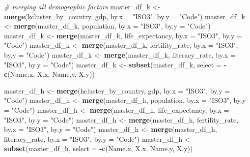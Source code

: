 \documentclass[]{article}
\newenvironment{Shaded}{\begin{snugshade}}{\end{snugshade}}
\newcommand{\CommentTok}[1]{\textcolor[rgb]{0.56,0.35,0.01}{\textit{#1}}}
\newcommand{\DataTypeTok}[1]{\textcolor[rgb]{0.13,0.29,0.53}{#1}}
\newcommand{\KeywordTok}[1]{\textcolor[rgb]{0.13,0.29,0.53}{\textbf{#1}}}
\newcommand{\NormalTok}[1]{#1}
\newcommand{\OperatorTok}[1]{\textcolor[rgb]{0.81,0.36,0.00}{\textbf{#1}}}
\newcommand{\StringTok}[1]{\textcolor[rgb]{0.31,0.60,0.02}{#1}}
\begin{document}
\begin{Shaded}
\begin{Highlighting}[]
\CommentTok{# merging all demographic factors}
\NormalTok{master_df_k <-}\StringTok{ }\KeywordTok{merge}\NormalTok{(kcluster_by_country, gdp, }\DataTypeTok{by.x =} \StringTok{"ISO3"}\NormalTok{, }\DataTypeTok{by.y =} \StringTok{"Code"}\NormalTok{)}
\NormalTok{master_df_k <-}\StringTok{ }\KeywordTok{merge}\NormalTok{(master_df_k, population, }\DataTypeTok{by.x =} \StringTok{"ISO3"}\NormalTok{, }\DataTypeTok{by.y =} \StringTok{"Code"}\NormalTok{)}
\NormalTok{master_df_k <-}\StringTok{ }\KeywordTok{merge}\NormalTok{(master_df_k, life_expectancy, }\DataTypeTok{by.x =} \StringTok{"ISO3"}\NormalTok{, }\DataTypeTok{by.y =} \StringTok{"Code"}\NormalTok{)}
\NormalTok{master_df_k <-}\StringTok{ }\KeywordTok{merge}\NormalTok{(master_df_k, fertility_rate, }\DataTypeTok{by.x =} \StringTok{"ISO3"}\NormalTok{, }\DataTypeTok{by.y =} \StringTok{"Code"}\NormalTok{)}
\NormalTok{master_df_k <-}\StringTok{ }\KeywordTok{merge}\NormalTok{(master_df_k, literacy_rate, }\DataTypeTok{by.x =} \StringTok{"ISO3"}\NormalTok{, }\DataTypeTok{by.y =} \StringTok{"Code"}\NormalTok{)}
\NormalTok{master_df_k <-}\StringTok{ }\KeywordTok{subset}\NormalTok{(master_df_k, }\DataTypeTok{select =} \OperatorTok{-}\KeywordTok{c}\NormalTok{(Name.x, X.x, Name.y, X.y))}

\NormalTok{master_df_h <-}\StringTok{ }\KeywordTok{merge}\NormalTok{(hcluster_by_country, gdp, }\DataTypeTok{by.x =} \StringTok{"ISO3"}\NormalTok{, }\DataTypeTok{by.y =} \StringTok{"Code"}\NormalTok{)}
\NormalTok{master_df_h <-}\StringTok{ }\KeywordTok{merge}\NormalTok{(master_df_h, population, }\DataTypeTok{by.x =} \StringTok{"ISO3"}\NormalTok{, }\DataTypeTok{by.y =} \StringTok{"Code"}\NormalTok{)}
\NormalTok{master_df_h <-}\StringTok{ }\KeywordTok{merge}\NormalTok{(master_df_h, life_expectancy, }\DataTypeTok{by.x =} \StringTok{"ISO3"}\NormalTok{, }\DataTypeTok{by.y =} \StringTok{"Code"}\NormalTok{)}
\NormalTok{master_df_h <-}\StringTok{ }\KeywordTok{merge}\NormalTok{(master_df_h, fertility_rate, }\DataTypeTok{by.x =} \StringTok{"ISO3"}\NormalTok{, }\DataTypeTok{by.y =} \StringTok{"Code"}\NormalTok{)}
\NormalTok{master_df_h <-}\StringTok{ }\KeywordTok{merge}\NormalTok{(master_df_h, literacy_rate, }\DataTypeTok{by.x =} \StringTok{"ISO3"}\NormalTok{, }\DataTypeTok{by.y =} \StringTok{"Code"}\NormalTok{)}
\NormalTok{master_df_h <-}\StringTok{ }\KeywordTok{subset}\NormalTok{(master_df_h, }\DataTypeTok{select =} \OperatorTok{-}\KeywordTok{c}\NormalTok{(Name.x, X.x, Name.y, X.y))}
\end{Highlighting}
\end{Shaded}
\end{document}

